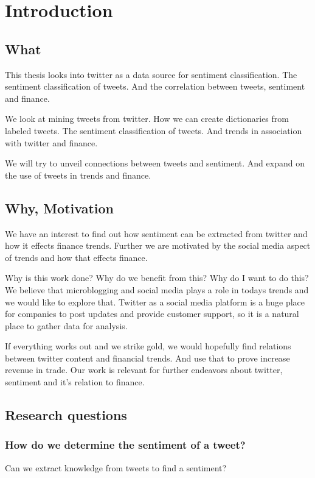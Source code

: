 \chapter{Introduction}\label{introduction}

\section{What}
This thesis looks into twitter as a data source for sentiment classification.
The sentiment classification of tweets. And the correlation between tweets,
sentiment and finance. 

We look at mining tweets from twitter. How we can create dictionaries from
labeled tweets. The sentiment classification of tweets. And trends in
association with twitter and finance. 

We will try to unveil connections between tweets and sentiment. And expand on
the use of tweets in trends and finance. 
%

\section{Why, Motivation}
We have an interest to find out how sentiment can be extracted from twitter and
how it effects finance trends. Further we are motivated by the social media
aspect of trends and how that effects finance. 

Why is this work done? Why do we benefit from this? Why do I want to do this?
We believe that microblogging and social media plays a role in todays trends
and we would like to explore that. Twitter as a social media platform is a huge
place for companies to post updates and provide customer support, so it is a
natural place to gather data for analysis. 

If everything works out and we strike gold, we would hopefully find relations
between twitter content and financial trends. And use that to prove increase
revenue in trade. Our work is relevant for further endeavors about twitter,
sentiment and it's relation to finance. 

\section{Research questions}
\subsection{How do we determine the sentiment of a tweet?\\}
Can we extract knowledge from tweets to find a sentiment?
	
